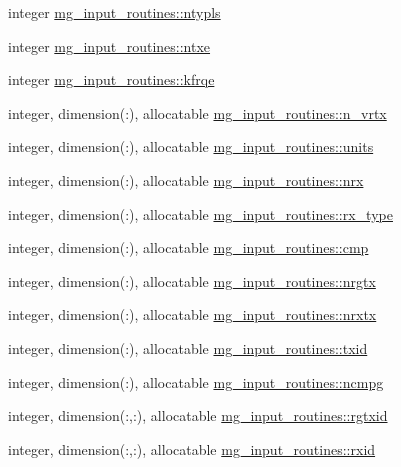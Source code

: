 \begin{DoxyCompactItemize}
\item 
integer \hyperlink{namespacemg__input__routines_a1ed0dfa7a7d1e414d233eb872ac6b470}{mg\+\_\+input\+\_\+routines\+::ntypls}
\item 
integer \hyperlink{namespacemg__input__routines_adcf11333203ba036b2614937ad871d98}{mg\+\_\+input\+\_\+routines\+::ntxe}
\item 
integer \hyperlink{namespacemg__input__routines_a7d0a5bd49c58f7353a16d46811fa6fb0}{mg\+\_\+input\+\_\+routines\+::kfrqe}
\item 
integer, dimension(\+:), allocatable \hyperlink{namespacemg__input__routines_a4c570440af762e32ddd4471fd251db81}{mg\+\_\+input\+\_\+routines\+::n\+\_\+vrtx}
\item 
integer, dimension(\+:), allocatable \hyperlink{namespacemg__input__routines_a6584411ca6eab9482783dbc2ac76657b}{mg\+\_\+input\+\_\+routines\+::units}
\item 
integer, dimension(\+:), allocatable \hyperlink{namespacemg__input__routines_ac29c1c1ff81a328ee04517d8c82e412e}{mg\+\_\+input\+\_\+routines\+::nrx}
\item 
integer, dimension(\+:), allocatable \hyperlink{namespacemg__input__routines_a38dac17cba9fbefbddbaba3132d72fdf}{mg\+\_\+input\+\_\+routines\+::rx\+\_\+type}
\item 
integer, dimension(\+:), allocatable \hyperlink{namespacemg__input__routines_aff413a8a8457c1b1ae4dc95fa3929e22}{mg\+\_\+input\+\_\+routines\+::cmp}
\item 
integer, dimension(\+:), allocatable \hyperlink{namespacemg__input__routines_a53e5187bb8d5de5ded517b9805249c2a}{mg\+\_\+input\+\_\+routines\+::nrgtx}
\item 
integer, dimension(\+:), allocatable \hyperlink{namespacemg__input__routines_a3aa7df29b322ecf88304eb186379ac60}{mg\+\_\+input\+\_\+routines\+::nrxtx}
\item 
integer, dimension(\+:), allocatable \hyperlink{namespacemg__input__routines_a190d393e9096530ede606f341fd3f384}{mg\+\_\+input\+\_\+routines\+::txid}
\item 
integer, dimension(\+:), allocatable \hyperlink{namespacemg__input__routines_ab931c6d3ad288e3913d59d1b5352da79}{mg\+\_\+input\+\_\+routines\+::ncmpg}
\item 
integer, dimension(\+:,\+:), allocatable \hyperlink{namespacemg__input__routines_a6f3e5551307f08834ddf664958d31c0b}{mg\+\_\+input\+\_\+routines\+::rgtxid}
\item 
integer, dimension(\+:,\+:), allocatable \hyperlink{namespacemg__input__routines_a94cbf0223e189e49ce9b4ed3de4dfb7c}{mg\+\_\+input\+\_\+routines\+::rxid}

\end{DoxyCompactItemize}
